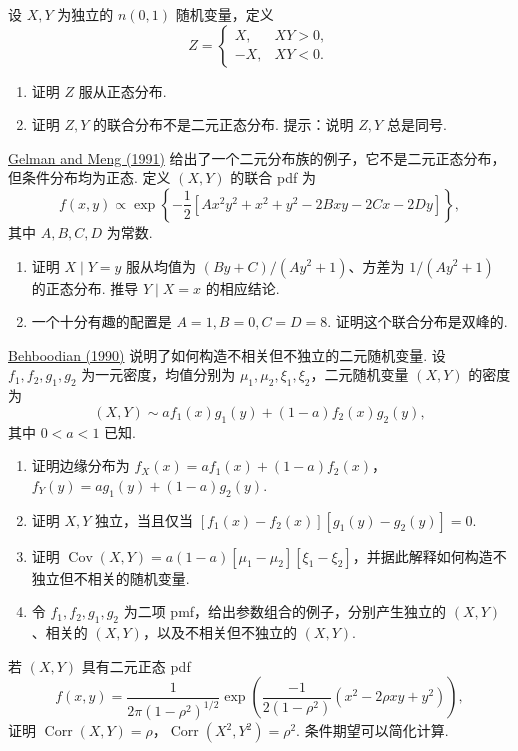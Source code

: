 \begin{exercise}[边缘正态性不蕴含二元正态性]\label{exercise:4.47}
设 $X,Y$ 为独立的 $n(0,1)$ 随机变量，定义
$$Z=\begin{cases}X,&XY>0,\\-X,&XY<0.\end{cases}$$
\begin{enumerate}
\item[(a)] 证明 $Z$ 服从正态分布.
\item[(b)] 证明 $Z,Y$ 的联合分布不是二元正态分布. 提示：说明 $Z,Y$ 总是同号.
\end{enumerate}
\end{exercise}
\begin{exercise}\label{exercise:4.48}
\hyperref[bib:source135]{Gelman and Meng (1991)} 给出了一个二元分布族的例子，它不是二元正态分布，但条件分布均为正态. 定义 $(X,Y)$ 的联合 pdf 为
$$f(x,y)\propto\exp\left\{-\frac12[Ax^2y^2+x^2+y^2-2Bxy-2Cx-2Dy]\right\},$$
其中 $A,B,C,D$ 为常数.
\begin{enumerate}
\item[(a)] 证明 $X\mid Y=y$ 服从均值为 $(By+C)/(Ay^2+1)$、方差为 $1/(Ay^2+1)$ 的正态分布. 推导 $Y\mid X=x$ 的相应结论.
\item[(b)] 一个十分有趣的配置是 $A=1,B=0,C=D=8$. 证明这个联合分布是双峰的.
\end{enumerate}
\end{exercise}
\begin{exercise}\label{exercise:4.49}
\hyperref[bib:source15]{Behboodian (1990)} 说明了如何构造不相关但不独立的二元随机变量. 设 $f_1,f_2,g_1,g_2$ 为一元密度，均值分别为 $\mu_1,\mu_2,\xi_1,\xi_2$，二元随机变量 $(X,Y)$ 的密度为
$$(X,Y)\sim af_1(x)g_1(y)+(1-a)f_2(x)g_2(y),$$
其中 $0<a<1$ 已知.
\begin{enumerate}
\item[(a)] 证明边缘分布为 $f_X(x)=af_1(x)+(1-a)f_2(x)$，$f_Y(y)=ag_1(y)+(1-a)g_2(y)$.
\item[(b)] 证明 $X,Y$ 独立，当且仅当 $[f_1(x)-f_2(x)][g_1(y)-g_2(y)]=0$.
\item[(c)] 证明 $\operatorname{Cov}(X,Y)=a(1-a)[\mu_1-\mu_2][\xi_1-\xi_2]$，并据此解释如何构造不独立但不相关的随机变量.
\item[(d)] 令 $f_1,f_2,g_1,g_2$ 为二项 pmf，给出参数组合的例子，分别产生独立的 $(X,Y)$、相关的 $(X,Y)$，以及不相关但不独立的 $(X,Y)$.
\end{enumerate}
\end{exercise}
\begin{exercise}\label{exercise:4.50}
若 $(X,Y)$ 具有二元正态 pdf
$$f(x,y)=\frac1{2\pi(1-\rho^2)^{1/2}}\exp\left(\frac{-1}{2(1-\rho^2)}(x^2-2\rho xy+y^2)\right),$$
证明 $\operatorname{Corr}(X,Y)=\rho$，$\operatorname{Corr}(X^2,Y^2)=\rho^2$. 条件期望可以简化计算.
\end{exercise}
